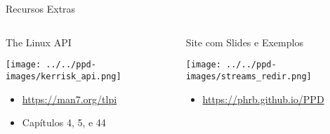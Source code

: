 \documentclass[10pt, compress, aspectratio=169, xcolor={table,usenames,dvipsnames}]{beamer}
\begin{document}
\begin{frame}[label={sec:orgfd04f8b}]{Recursos Extras}
\begin{columns}
\begin{column}{0.5\columnwidth}
\begin{block}{The Linux API}
\begin{center}
\texttt{[image: ../../ppd-images/kerrisk\_api.png]}
\end{center}

\begin{itemize}
\item \url{https://man7.org/tlpi}
\item Capítulos 4, 5, e 44
\end{itemize}
\end{block}
\end{column}

\begin{column}{0.5\columnwidth}
\begin{block}{Site com Slides e Exemplos}
\begin{center}
\texttt{[image: ../../ppd-images/streams\_redir.png]}
\end{center}

\begin{itemize}
\item \url{https://phrb.github.io/PPD}
\end{itemize}
\end{block}
\end{column}
\end{columns}
\end{frame}
\end{document}
